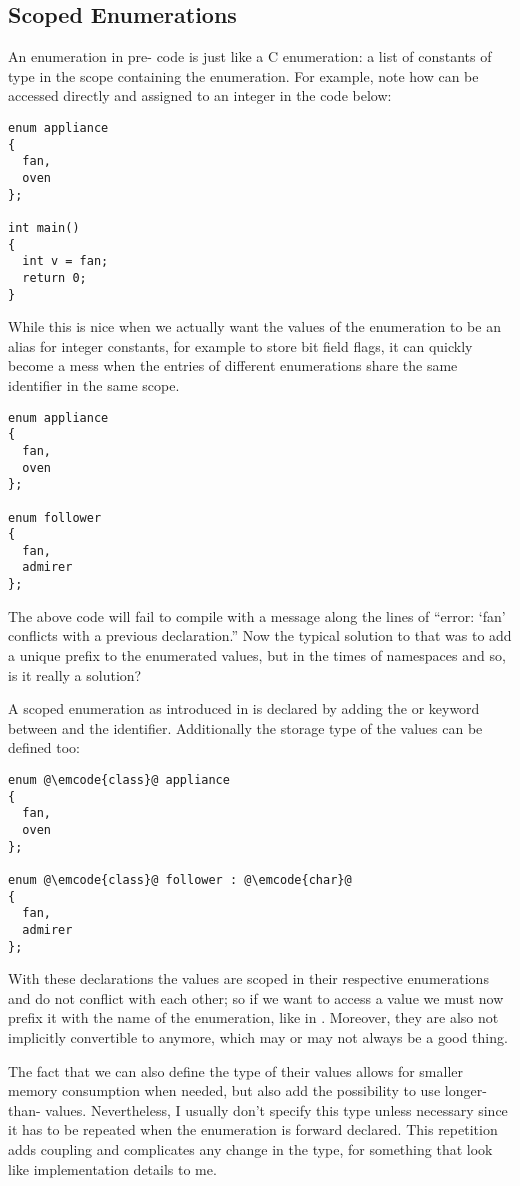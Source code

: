 \subsection{Scoped Enumerations}

An enumeration in pre- code is just like a C enumeration: a list
of constants of type  in the scope containing the
enumeration. For example, note how  can be
accessed directly and assigned to an integer in the code below:

\begin{lstlisting}
enum appliance
{
  fan,
  oven
};

int main()
{
  int v = fan;
  return 0;
}
\end{lstlisting}

While this is nice when we actually want the values of the
enumeration to be an alias for integer constants, for example to store
bit field flags, it can quickly become a mess when the entries of
different enumerations share the same identifier in the same scope.

\begin{lstlisting}
enum appliance
{
  fan,
  oven
};

enum follower
{
  fan,
  admirer
};
\end{lstlisting}

The above code will fail to compile with a message along the lines of
``error: ‘fan’ conflicts with a previous declaration.'' Now the
typical solution to that was to add a unique prefix to the enumerated
values, but in the times of namespaces and so, is it really a solution?

\bigskip

A scoped enumeration as introduced in  is declared by adding the
 or  keyword between  and the
identifier. Additionally the storage type of the values can be defined
too:

\begin{lstlisting}
enum @\emcode{class}@ appliance
{
  fan,
  oven
};

enum @\emcode{class}@ follower : @\emcode{char}@
{
  fan,
  admirer
};
\end{lstlisting}

With these declarations the values are scoped in their respective
enumerations and do not conflict with each other; so if we want to
access a value we must now prefix it with the name of the enumeration,
like in . Moreover, they are also not implicitly
convertible to  anymore, which may or may not always be a
good thing.

The fact that we can also define the type of their values allows for
smaller memory consumption when needed, but also add the possibility
to use longer-than- values. Nevertheless, I usually don't
specify this type unless necessary since it has to be repeated when
the enumeration is forward declared. This repetition adds coupling and
complicates any change in the type, for something that look like
implementation details to me.

